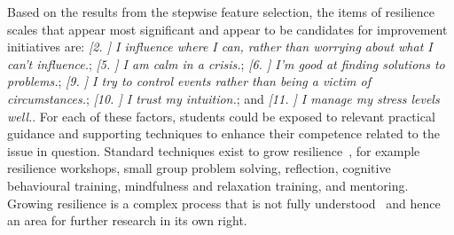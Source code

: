 \documentclass[sigconf]{acmart}
\begin{document}
Based on the results from the stepwise feature selection, the items of resilience scales that appear most significant and appear to be candidates for improvement initiatives are: {\emph{[2. ] I influence where I can, rather than worrying about what I can't influence.}}; {\emph{[5. ] I am calm in a crisis.}}; {\emph{[6. ] I'm good at finding solutions to problems.}}; {\emph{[9. ] I try to control events rather than being a victim of circumstances.}}; {\emph{[10. ] I trust my intuition.}}; and {\emph{[11. ] I manage my stress levels well.}}. For each of these factors, students could be exposed to relevant practical guidance and supporting techniques to enhance their competence related to the issue in question. Standard techniques exist to grow resilience~\cite{Walker2006, Vailes2017, Rodgers2016}, for example resilience workshops, small group problem solving, reflection, cognitive behavioural training, mindfulness and relaxation training, and mentoring. Growing resilience is a complex process that is not fully understood~\cite{Rodgers2016} and hence an area for further research in its own right.
\end{document}
